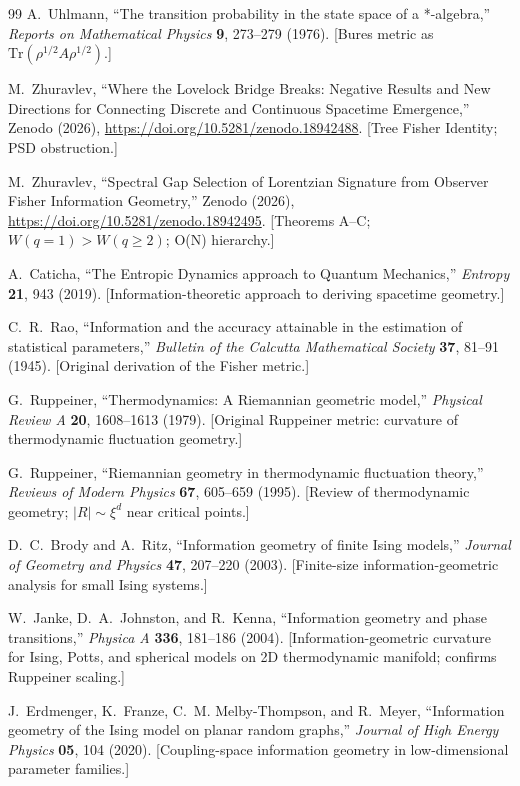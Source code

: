 \documentclass[11pt]{article}
\theoremstyle{definition}
\theoremstyle{remark}
\begin{document}
\begin{thebibliography}{99}
A.\ Uhlmann,
``The transition probability in the state space of a *-algebra,''
\textit{Reports on Mathematical Physics} \textbf{9}, 273--279 (1976).
[Bures metric as $\mathrm{Tr}(\rho^{1/2} A \rho^{1/2})$.]

M.~Zhuravlev,
``Where the Lovelock Bridge Breaks: Negative Results and New Directions
for Connecting Discrete and Continuous Spacetime Emergence,''
Zenodo (2026), \url{https://doi.org/10.5281/zenodo.18942488}.
[Tree Fisher Identity; PSD obstruction.]

M.~Zhuravlev,
``Spectral Gap Selection of Lorentzian Signature from Observer Fisher
Information Geometry,''
Zenodo (2026), \url{https://doi.org/10.5281/zenodo.18942495}.
[Theorems A--C; $W(q=1) > W(q\geq 2)$; O(N) hierarchy.]

A.\ Caticha,
``The Entropic Dynamics approach to Quantum Mechanics,''
\textit{Entropy} \textbf{21}, 943 (2019).
[Information-theoretic approach to deriving spacetime geometry.]

C.\ R.\ Rao,
``Information and the accuracy attainable in the estimation of
statistical parameters,''
\textit{Bulletin of the Calcutta Mathematical Society} \textbf{37},
81--91 (1945).
[Original derivation of the Fisher metric.]

G.\ Ruppeiner,
``Thermodynamics: A Riemannian geometric model,''
\textit{Physical Review A} \textbf{20}, 1608--1613 (1979).
[Original Ruppeiner metric: curvature of thermodynamic fluctuation geometry.]

G.\ Ruppeiner,
``Riemannian geometry in thermodynamic fluctuation theory,''
\textit{Reviews of Modern Physics} \textbf{67}, 605--659 (1995).
[Review of thermodynamic geometry; $|R| \sim \xi^d$ near critical points.]

D.\ C.\ Brody and A.\ Ritz,
``Information geometry of finite Ising models,''
\textit{Journal of Geometry and Physics} \textbf{47}, 207--220 (2003).
[Finite-size information-geometric analysis for small Ising systems.]

W.\ Janke, D.\ A.\ Johnston, and R.\ Kenna,
``Information geometry and phase transitions,''
\textit{Physica A} \textbf{336}, 181--186 (2004).
[Information-geometric curvature for Ising, Potts, and spherical models
on 2D thermodynamic manifold; confirms Ruppeiner scaling.]

J.\ Erdmenger, K.\ Franze, C.\ M. Melby-Thompson, and R.\ Meyer,
``Information geometry of the Ising model on planar random graphs,''
\textit{Journal of High Energy Physics} \textbf{05}, 104 (2020).
[Coupling-space information geometry in low-dimensional parameter families.]


\end{thebibliography}
\end{document}
